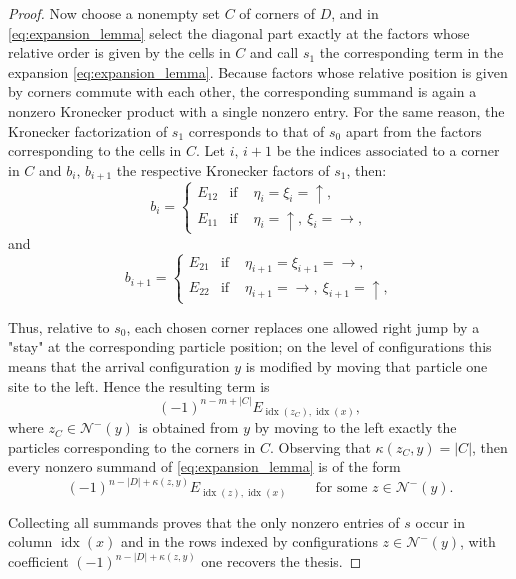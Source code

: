 \documentclass[10pt,a4paper]{amsart}
\begin{document}
\begin{proof}
Now choose a nonempty set $C$ of corners of $D$, and in \eqref{eq:expansion_lemma} select the diagonal part exactly at the factors whose relative order is given by the cells in $C$ and call $s_1$ the corresponding term in the expansion \eqref{eq:expansion_lemma}. Because factors whose relative position is given by corners commute with each other, the corresponding summand is again a nonzero Kronecker 
product with a single nonzero entry. For the same reason, the Kronecker factorization of $s_1$ corresponds to that of $s_0$ apart from the factors corresponding to the cells in $C$. Let $i,\,i+1$ be the indices associated to a corner in $C$ and $b_i,\, b_{i+1}$ the respective Kronecker factors of $s_1$, then:
 \begin{equation*}
    b_{i}=\left\{
        \begin{array}{lll}
         E_{12}  &\text{if }  &\eta_{i}=\xi_{i}=\uparrow, \\ 
         E_{11}  &\text{if }  &\eta_{i}=\uparrow, \ \xi_{i}=\rightarrow,
        \end{array}\right.
\end{equation*}
and
\begin{equation*} 
    b_{i+1}=\left\{
        \begin{array}{lll}
         E_{21}  &\text{if }  &\eta_{i+1}=\xi_{i+1}=\rightarrow, \\ 
         E_{22}  &\text{if }  &\eta_{i+1}=\rightarrow, \ \xi_{i+1}=\uparrow,
        \end{array}\right.
    \end{equation*}

Thus, relative to $s_0$, each chosen corner replaces one allowed right jump by a "stay" at the corresponding particle position; on the level of configurations this means that the arrival configuration $y$ is modified by moving that particle one site to the left. Hence the resulting term is
\[
(-1)^{n-m+|C|}E_{\operatorname{idx}(z_C),\operatorname{idx}(x)},
\]
where $z_C\in\mathcal{N}^-(y)$ is obtained from $y$ by moving to the left exactly the particles corresponding to the corners in $C$. Observing that $\kappa(z_C,y)=|C|$, then every nonzero summand of \eqref{eq:expansion_lemma} is of the form
\[
(-1)^{n-|D|+\kappa(z,y)}E_{\operatorname{idx}(z),\operatorname{idx}(x)}
\qquad\text{for some }z\in\mathcal{N}^-(y).
\]

Collecting all summands proves that the only nonzero entries of $s$ occur in column $\operatorname{idx}(x)$ and in the rows indexed by configurations $z\in\mathcal{N}^-(y)$, with coefficient $(-1)^{n-|D|+\kappa(z,y)}$ one recovers the thesis.

\end{proof}
\end{document}
